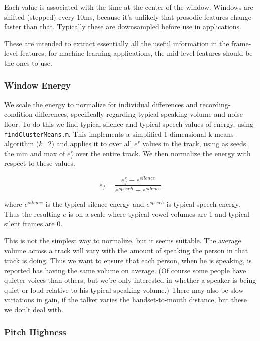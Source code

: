 \documentclass[11pt]{article}
\begin{document}
Each value is associated with the time at the center of the window.
Windows are shifted (stepped) every 10ms, because it's unlikely that
prosodic features change faster than that.  Typically these are
downsampled before use in applications.

These are intended to extract essentially all the useful information
in the frame-level features; for machine-learning applications, the
mid-level features should be the ones to use. 


\subsubsection{Window Energy}

We scale the energy to normalize for individual differences and
recording-condition differences, specifically regarding typical
speaking volume and noise floor.  To do this we find typical-silence
and typical-speech values of energy, using {\tt findClusterMeans.m}.
This implements a simplified 1-dimensional k-means algorithm ($k$=2)
and applies it to over all $e^r$ values in the track, using as seeds
the min and max of $e_f^r$ over the entire track.  We then normalize
the energy with respect to these values.

\begin{equation}
e_f = \frac{ e_f^r - e^{silence} }{e^{speech} - e ^{silence}}
\end{equation}

where $e^{silence}$ is the typical silence energy and $e^{speech}$ is
typical speech energy.  Thus the resulting $e$ is on a scale where
typical vowel volumes are 1 and typical silent frames are 0.

This is not the simplest way to normalize, but it seems suitable.
The average volume across a track will vary with the amount of
speaking the person in that track is doing.  Thus we want to ensure
that each person, when he is speaking, is reported has having the same
volume on average.  (Of course some people have quieter voices than
others, but we're only interested in whether a speaker is being quiet
or loud relative to his typical speaking volume.)  There may also be
slow variations in gain, if the talker varies the handset-to-mouth
distance, but these we don't deal with.

\subsubsection{Pitch Highness}
\end{document}
